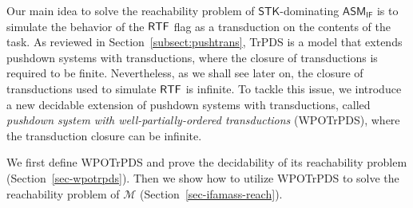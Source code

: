 \documentclass[preprint,12pt]{elsarticle}
\newcommand\Mm{{\mathcal{M} }}
\newcommand\rtfflag{{\sf RTF}}
\newcommand{\IFAMASS}{\textsf{ASM}_\textsf{IF}}
\newcommand{\STK}{\mathsf{STK}}
\newcommand{\TrPDS}{\textsf{TrPDS}}
\newcommand{\WOTrPDS}{\textsf{WPOTrPDS}}
\begin{document}
Our main idea to solve the reachability problem of $\STK$-dominating $\IFAMASS$ is to simulate the behavior of the $\rtfflag$ flag as a transduction on the contents of the task. As reviewed in Section~\ref{subsect:pushtrans}, {\TrPDS} is a model that extends pushdown systems with transductions, where the closure of transductions is required to be finite. Nevertheless, as we shall see later on, the closure of transductions used to simulate $\rtfflag$ is infinite. To tackle this issue, we introduce a new decidable extension of pushdown systems with transductions, called \emph{pushdown system with well-partially-ordered transductions} (\WOTrPDS), where the transduction closure can be infinite. 

We first define {\WOTrPDS} and prove the decidability of its reachability problem (Section~\ref{sec-wpotrpds}). Then we show how to utilize {\WOTrPDS} to solve the reachability problem of $\Mm$ (Section~\ref{sec-ifamass-reach}). 
\end{document}

